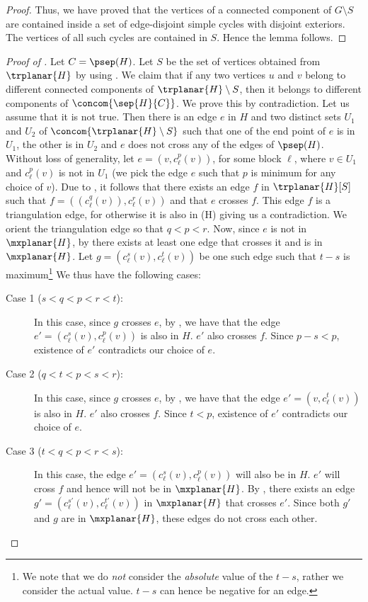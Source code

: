 \documentclass{toc}
\begin{document}
\begin{proof}
Thus, we have proved that the vertices of a connected component of $G\setminus S$ are contained inside a set of edge-disjoint simple cycles with disjoint exteriors. The vertices of all such cycles are contained in $S$. Hence the lemma follows.
\end{proof}

\begin{proof}[Proof of ]
Let $C = \psep(H)$. Let $S$ be the set of vertices obtained from $\trplanar{H}$ by using . We claim that if any two vertices $u$ and $v$ belong to different connected components of $\trplanar{H} \setminus S$, then it belongs to different components of $\concom{\sep{H}{C}}$. We prove this by contradiction. Let us assume that it is not true. Then there is an edge $e$ in $H$ and two distinct sets $U_1$ and $U_2$ of $\concom{\trplanar{H}\setminus S}$ such that one of the end point of $e$ is in $U_1$, the other is in $U_2$ and $e$ does not cross any of the edges of $\psep(H)$. Without loss of generality, let $e = (v, c_{\ell}^p(v))$, for some block $\ell$, where $v \in U_1$ and $c_{\ell}^p(v)$ is not in $U_1$ (we pick the edge $e$ such that $p$ is minimum for any choice of $v$). Due to , it follows that there exists an edge $f$ in $\trplanar{H}[S]$ such that $f = ((c_{\ell}^q(v)), c_{\ell}^r(v))$ and that $e$ crosses $f$. This edge $f$ is a triangulation edge, for otherwise it is also %
 in \psep(H) giving us a contradiction. We orient the triangulation edge so that $q < p < r$. Now, since $e$ is not %
 in $\mxplanar{H}$, by  there exists at least one edge that crosses it and is %
 in $\mxplanar{H}$. Let $g = (c_{\ell}^s(v), c_{\ell}^t(v))$ be one such edge such that $t - s$ is maximum\footnote{We note that we do \emph{not} consider the \emph{absolute} value of the $t-s$, rather we consider the actual value. $t-s$ can hence be negative for an edge.} We thus have the following cases:
\begin{description}
\item[Case 1 ($s<q<p<r<t$):] In this case, since $g$ crosses $e$, by
, we have that the edge $e' = (c_{\ell}^s(v), c_{\ell}^p(v))$ is also %
 in $H$. $e'$ also crosses $f$. Since $p-s < p$, existence of $e'$ contradicts our choice of $e$.
\item[Case 2 ($q<t<p<s<r$):] In this case, since $g$ crosses $e$, by 
, we have that the edge $e' = (v, c_{\ell}^t(v))$ is also %
 in $H$. $e'$ also crosses $f$. Since $t < p$, existence of $e'$ contradicts our choice of $e$.
\item[Case 3 ($t<q<p<r<s$):] In this case, the edge $e' = (c_{\ell}^{s}(v), c_{\ell}^p(v))$ will also be %
 in $H$. $e'$ will cross $f$ and hence will not be %
 in $\mxplanar{H}$. By , there exists an edge $g' = (c_{\ell}^{s'}(v), c_{\ell}^{t'}(v))$ in $\mxplanar{H}$ that crosses $e'$. Since both $g'$ and $g$ are %
 in $\mxplanar{H}$, these edges %
do not %
cross each other. 


\end{description}
\end{proof}
\end{document}
